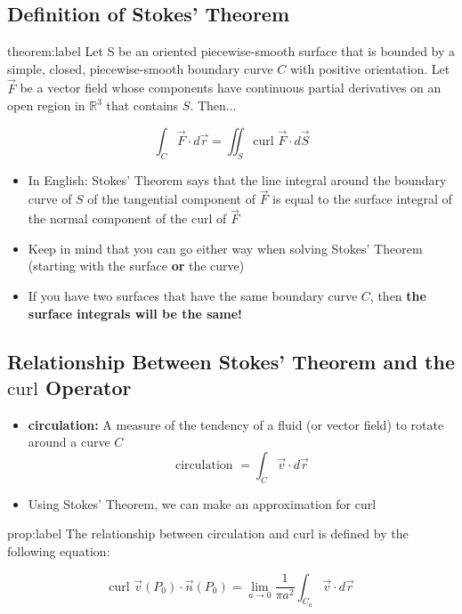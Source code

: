 \documentclass{package/notes}
\begin{document}
\newpage
\subsection{Definition of Stokes' Theorem}

\begin{theorem}{theorem:label}
	Let S be an oriented piecewise-smooth surface that is bounded by a simple, closed, piecewise-smooth boundary curve $C$ with positive orientation. Let $\vec{F}$ be a vector field whose components have continuous partial derivatives on an open region in $\mathbb{R}^3$ that contains $S$. Then...

	$$\int_C\vec{F}\cdot d\vec{r} = \iint_S \text{curl } \vec{F} \cdot d\vec{S}$$
\end{theorem}

\begin{itemize}
	\item In English: Stokes' Theorem says that the line integral around the boundary curve of $S$ of the tangential component of $\vec{F}$ is equal to the surface integral of the normal component of the curl of $\vec{F}$ 
	\item Keep in mind that you can go either way when solving Stokes' Theorem (starting with the surface \textbf{or} the curve)
	\item If you have two surfaces that have the same boundary curve $C$, then \textbf{the surface integrals will be the same!}
\end{itemize}


\subsection{Relationship Between Stokes' Theorem and the $\text{curl}$ Operator}

\begin{itemize}
	\item \textbf{circulation:} A measure of the tendency of a fluid (or vector field) to rotate around a curve $C$ 
	$$\text{circulation } = \int_C \vec{v} \cdot d\vec{r}$$
	\item Using Stokes' Theorem, we can make an approximation for curl
\end{itemize}

\begin{proposition}{prop:label}
	The relationship between circulation and curl is defined by the following equation:

	$$\text{curl }\vec{v}(P_0) \cdot \vec{n}(P_0) = \lim_{a\to0} \frac {1}{\pi a^2}\int_{C_a} \vec{v} \cdot d\vec{r}$$
\end{proposition}
\end{document}
